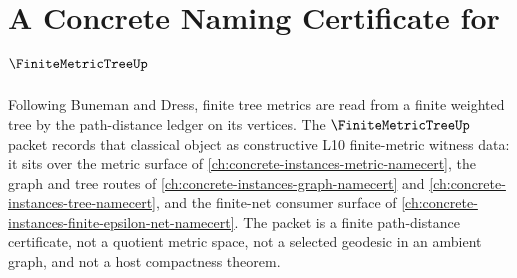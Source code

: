 \chapter{A Concrete Naming Certificate for $\FiniteMetricTreeUp$}
\label{ch:concrete-instances-finite-metric-tree-namecert}

Following Buneman and Dress, finite tree metrics are read from a finite weighted tree by the path-distance ledger on its vertices. The $\FiniteMetricTreeUp$ packet records that classical object as constructive L10 finite-metric witness data: it sits over the metric surface of \autoref{ch:concrete-instances-metric-namecert}, the graph and tree routes of \autoref{ch:concrete-instances-graph-namecert} and \autoref{ch:concrete-instances-tree-namecert}, and the finite-net consumer surface of \autoref{ch:concrete-instances-finite-epsilon-net-namecert}. The packet is a finite path-distance certificate, not a quotient metric space, not a selected geodesic in an ambient graph, and not a host compactness theorem.

